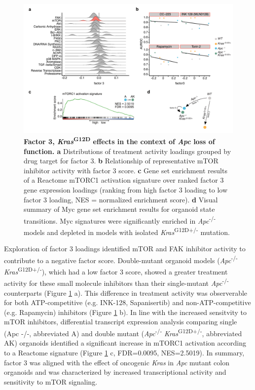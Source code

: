 \begin{flushleft}
\begin{figure}[h]
\centering
\includegraphics[scale=0.75,
                keepaspectratio]{figures/adenomaprofiling/pdf/fig_4_1.pdf}
\caption[Factor 3, \textit{Kras}\textsuperscript{G12D} effects in the context of \textit{Apc} loss of function]{\textbf{Factor 3, \textit{Kras}\textsuperscript{G12D} effects in the context of \textit{Apc} loss of function. a} Distributions of treatment activity loadings grouped by drug target for factor 3. \textbf{b} Relationship of representative mTOR inhibitor activity with factor 3 score. \textbf{c} Gene set enrichment results of a Reactome mTORC1 activation signature over ranked factor 3 gene expression loadings (ranking from high factor 3 loading to low factor 3 loading, NES = normalized enrichment score). \textbf{d} Visual summary of Myc gene set enrichment results for organoid state transitions. Myc signatures were significantly enriched in \textit{Apc}\textsuperscript{-/-}  models and depleted in models with isolated \textit{Kras}\textsuperscript{G12D+/-} mutation.}
\label{fig_300}
\end{figure}
\bigbreak

Exploration of factor 3 loadings identified mTOR and FAK inhibitor activity to contribute to a negative factor score. Double-mutant organoid models (\textit{Apc}\textsuperscript{-/-} \textit{Kras}\textsuperscript{G12D+/-}), which had a low factor 3 score, showed a greater treatment activity for these small molecule inhibitors than their single-mutant \textit{Apc}\textsuperscript{-/-}  counterparts (Figure \ref{fig_300} a). This difference in treatment activity was observerable for both ATP-competitive (e.g. INK-128, Sapanisertib) and non-ATP-competitive (e.g. Rapamycin) inhibitors (Figure \ref{fig_300} b). In line with the increased sensitvity to mTOR inhibitors, differential transcript expression analysis comparing single (Apc -/-, abbreviated A) and double mutant (\textit{Apc}\textsuperscript{-/-} \textit{Kras}\textsuperscript{G12D+/-}, abbreviated AK) organoids identified a significant increase in mTORC1 activation according to a Reactome signature (Figure \ref{fig_300} c, FDR=0.0095, NES=2.5019). In summary, factor 3 was aligned with the effect of oncogenic \textit{Kras} in \textit{Apc} mutant colon organoids and was characterized by increased transcriptional activity and sensitivity to mTOR signaling.



\end{flushleft}
